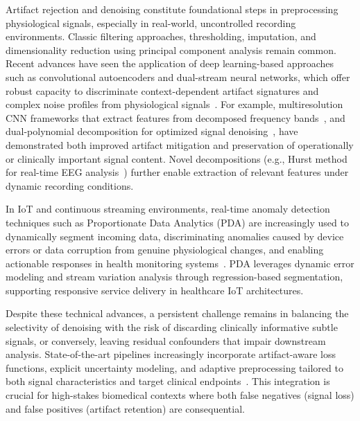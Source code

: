 \documentclass[sigconf]{acmart}
\begin{document}
Artifact rejection and denoising constitute foundational steps in preprocessing physiological signals, especially in real-world, uncontrolled recording environments. Classic filtering approaches, thresholding, imputation, and dimensionality reduction using principal component analysis remain common. Recent advances have seen the application of deep learning-based approaches such as convolutional autoencoders and dual-stream neural networks, which offer robust capacity to discriminate context-dependent artifact signatures and complex noise profiles from physiological signals~\cite{ref96,ref97,ref102}. For example, multiresolution CNN frameworks that extract features from decomposed frequency bands~\cite{ref102}, and dual-polynomial decomposition for optimized signal denoising~\cite{ref97}, have demonstrated both improved artifact mitigation and preservation of operationally or clinically important signal content. Novel decompositions (e.g., Hurst method for real-time EEG analysis~\cite{ref96}) further enable extraction of relevant features under dynamic recording conditions.

In IoT and continuous streaming environments, real-time anomaly detection techniques such as Proportionate Data Analytics (PDA) are increasingly used to dynamically segment incoming data, discriminating anomalies caused by device errors or data corruption from genuine physiological changes, and enabling actionable responses in health monitoring systems~\cite{ref90,ref106}. PDA leverages dynamic error modeling and stream variation analysis through regression-based segmentation, supporting responsive service delivery in healthcare IoT architectures.

Despite these technical advances, a persistent challenge remains in balancing the selectivity of denoising with the risk of discarding clinically informative subtle signals, or conversely, leaving residual confounders that impair downstream analysis. State-of-the-art pipelines increasingly incorporate artifact-aware loss functions, explicit uncertainty modeling, and adaptive preprocessing tailored to both signal characteristics and target clinical endpoints~\cite{ref106}. This integration is crucial for high-stakes biomedical contexts where both false negatives (signal loss) and false positives (artifact retention) are consequential.
\end{document}
